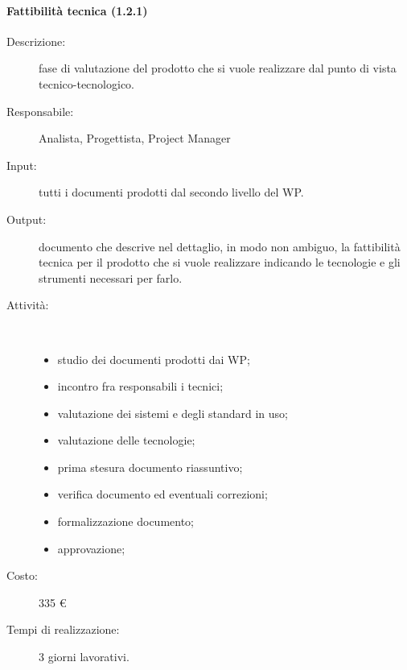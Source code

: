 \paragraph{Fattibilit\`{a} tecnica (1.2.1)}
\begin{description}
\item[Descrizione:] fase di valutazione del prodotto che si vuole realizzare dal punto di vista tecnico-tecnologico.
\item[Responsabile:] Analista, Progettista, Project Manager
\item[Input:] tutti i documenti prodotti dal secondo livello del WP.
\item[Output:] documento che descrive nel dettaglio, in modo non ambiguo, la fattibilità tecnica per il prodotto che si vuole realizzare indicando le tecnologie e gli strumenti necessari per farlo.
\item[Attività:]\mbox{}\\[-1.5\baselineskip]
	\begin{itemize}
	\item studio dei documenti prodotti dai WP;
	\item incontro fra responsabili i tecnici;
	\item valutazione dei sistemi e degli standard in uso;
	\item valutazione delle tecnologie;
	\item prima stesura documento riassuntivo;
	\item verifica documento ed eventuali correzioni;
	\item formalizzazione documento;
	\item approvazione;
	\end{itemize}
\item[Costo:] 335 \euro{}
\item[Tempi di realizzazione:] 3 giorni lavorativi.
\end{description}

